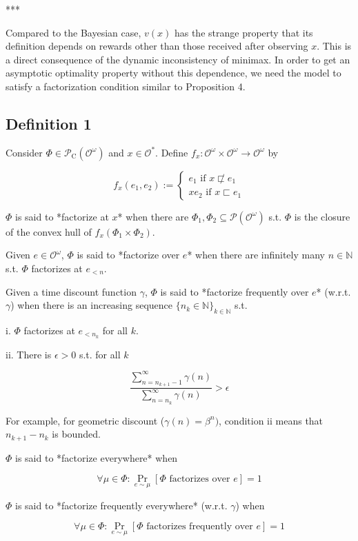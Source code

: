 \documentclass[a4paper]{article}
\DeclareMathOperator{\Prb}{Pr}
\newcommand{\Nats}{\mathbb{N}}
\newcommand{\Prob}{\mathcal{P}}
\newcommand{\Obs}{\mathcal{O}}
\newcommand{\ObsO}{\Obs^\omega}
\newcommand{\CC}{\mathcal{P}_{\operatorname{C}}}
\begin{document}
***

Compared to the Bayesian case, ${v(x)}$ has the strange property that its definition depends on rewards other than those received after observing ${x}$. This is a direct consequence of the dynamic inconsistency of minimax. In order to get an asymptotic optimality property without this dependence, we need the model to satisfy a factorization condition similar to Proposition 4.

\subsection{Definition 1}

Consider ${\Phi \in \CC(\ObsO)}$ and ${x \in \Obs^*}$. Define ${f_x: \ObsO \times \ObsO \rightarrow \ObsO}$ by

$${f_x(e_1,e_2):=\begin{cases}e_1 \text{ if } x \not\sqsubset e_1 \\xe_2 \text{ if } x \sqsubset e_1\end{cases}}$$

${\Phi}$ is said to *factorize at ${x}$* when there are ${\Phi_1, \Phi_2 \subseteq \Prob(\ObsO)}$ s.t. ${\Phi}$ is the closure of the convex hull of ${f_x(\Phi_1 \times \Phi_2)}$.

Given ${e \in \ObsO}$, ${\Phi}$ is said to *factorize over ${e}$* when there are infinitely many ${n \in \Nats}$ s.t. ${\Phi}$ factorizes at ${e_{<n}}$.

Given a time discount function ${\gamma}$, ${\Phi}$ is said to *factorize frequently over ${e}$* (w.r.t. ${\gamma}$) when there is an increasing sequence ${\{n_k \in \Nats\}_{k \in \Nats}}$ s.t.

i. ${\Phi}$ factorizes at ${e_{<n_k}}$ for all ${k}$.

ii. There is ${\epsilon > 0}$ s.t. for all ${k}$

$$\frac{\sum_{n = n_{k+1}-1}^\infty \gamma(n)}{\sum_{n = n_{k}}^\infty \gamma(n)} > \epsilon$$

For example, for geometric discount (${\gamma(n)=\beta^n)}$, condition ii means that ${n_{k+1}-n_k}$  is bounded.

${\Phi}$ is said to *factorize everywhere* when 

$${\forall \mu \in \Phi: \Prb_{e \sim \mu}[\Phi \text{ factorizes over } e] = 1}$$

${\Phi}$ is said to *factorize frequently everywhere* (w.r.t. ${\gamma}$) when

$${\forall \mu \in \Phi: \Prb_{e \sim \mu}[\Phi \text{ factorizes frequently over } e] = 1}$$
\end{document}
